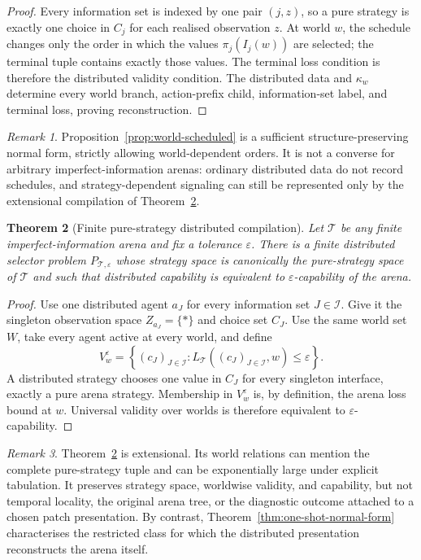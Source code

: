 \documentclass[11pt]{article}
\theoremstyle{plain}
\newtheorem{theorem}{Theorem}[section]
\theoremstyle{definition}
\theoremstyle{remark}
\newtheorem{remark}[theorem]{Remark}
\newcommand{\eps}{\varepsilon}
\begin{document}
\begin{proof}
Every information set is indexed by one pair $(j,z)$, so a pure strategy is
exactly one choice in $C_j$ for each realised observation $z$. At world $w$,
the schedule changes only the order in which the values
$\pi_j(I_j(w))$ are selected; the terminal tuple contains exactly those values.
The terminal loss condition is therefore the distributed validity condition.
The distributed data and $\kappa_w$ determine every world branch, action-prefix
child, information-set label, and terminal loss, proving reconstruction.
\end{proof}

\begin{remark}
Proposition~\ref{prop:world-scheduled} is a sufficient structure-preserving
normal form, strictly allowing world-dependent orders. It is not a converse for
arbitrary imperfect-information arenas: ordinary distributed data do not record
schedules, and strategy-dependent signaling can still be represented only by
the extensional compilation of Theorem~\ref{thm:finite-ii-compilation}.
\end{remark}

\begin{theorem}[Finite pure-strategy distributed compilation]
\label{thm:finite-ii-compilation}
Let $\mathcal T$ be any finite imperfect-information arena and fix a tolerance
$\eps$. There is a finite distributed selector problem $P_{\mathcal T,\eps}$
whose strategy space is canonically the pure-strategy space of $\mathcal T$ and
such that distributed capability is equivalent to $\eps$-capability of the
arena.
\end{theorem}

\begin{proof}
Use one distributed agent $a_J$ for every information set $J\in\mathcal I$.
Give it the singleton observation space $Z_{a_J}=\{\ast\}$ and choice set $C_J$.
Use the same world set $W$, take every agent active at every world, and define
\[
V_w^\eps=
\left\{(c_J)_{J\in\mathcal I}:
L_{\mathcal T}((c_J)_{J\in\mathcal I},w)\le\eps\right\}.
\]
A distributed strategy chooses one value in $C_J$ for every singleton
interface, exactly a pure arena strategy. Membership in $V_w^\eps$ is, by
definition, the arena loss bound at $w$. Universal validity over worlds is
therefore equivalent to $\eps$-capability.
\end{proof}

\begin{remark}
Theorem~\ref{thm:finite-ii-compilation} is extensional. Its world relations can
mention the complete pure-strategy tuple and can be exponentially large under
explicit tabulation. It preserves strategy space, worldwise validity, and
capability, but not temporal locality, the original arena tree, or the diagnostic
outcome attached to a chosen patch presentation. By contrast,
Theorem~\ref{thm:one-shot-normal-form} characterises the restricted class for
which the distributed presentation reconstructs the arena itself.
\end{remark}
\end{document}
